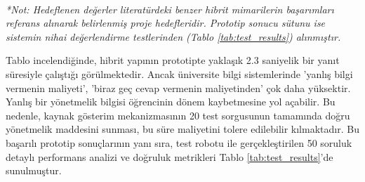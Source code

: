 \documentclass[12pt,a4paper]{report}
\begin{document}
\begin{table}[H]
\centering
\caption{Önerilen Sistemin Literatürdeki Yöntemlerle Karşılaştırmalı Analizi ve Prototip Sonuçları}
\label{tab:tartisma_tablosu}
\vspace{0.2cm} \\
\footnotesize{\textit{*Not: Hedeflenen değerler literatürdeki benzer hibrit mimarilerin başarımları referans alınarak belirlenmiş proje hedefleridir. Prototip sonucu sütunu ise sistemin nihai değerlendirme testlerinden (Tablo \ref{tab:test_results}) alınmıştır.}}
\end{table}

Tablo incelendiğinde, hibrit yapının prototipte yaklaşık 2.3 saniyelik bir yanıt süresiyle çalıştığı görülmektedir. Ancak üniversite bilgi sistemlerinde 'yanlış bilgi vermenin maliyeti', 'biraz geç cevap vermenin maliyetinden' çok daha yüksektir. Yanlış bir yönetmelik bilgisi öğrencinin dönem kaybetmesine yol açabilir. Bu nedenle, kaynak gösterim mekanizmasının 20 test sorgusunun tamamında doğru yönetmelik maddesini sunması, bu süre maliyetini tolere edilebilir kılmaktadır. Bu başarılı prototip sonuçlarının yanı sıra, test robotu ile gerçekleştirilen 50 soruluk detaylı performans analizi ve doğruluk metrikleri Tablo \ref{tab:test_results}'de sunulmuştur.
\end{document}
